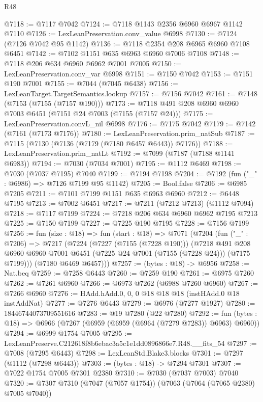 \begin{lexlean}{R48}
\begin{coremodule}
@7118 := @7117 @7042
@7124 := @7118 @1143 @2356 @6960 @6967 @1142 @7110
@7126 := LexLeanPreservation.conv_value @6998
@7130 := @7124 (@7126 @7042 @95 @1142)
@7136 := @7118 @2354 @208 @6965 @6960 @7108 @6451
@7142 := @7102 @1151 @635 @6963 @6960 @7006 @7108
@7148 := @7118 @206 @634 @6960 @6962 @7001 @7005
@7150 := LexLeanPreservation.conv_var @6998
@7151 := @7150 @7042
@7153 := @7151 @190 @7001
@7155 := @7044 (@7045 @6438)
@7156 := LexLeanTarget.TargetSemantics.lookup
@7157 := @7156 @7042
@7161 := @7148 (@7153 (@7155 (@7157 @190)))
@7173 := @7118 @491 @208 @6960 @6960 @7003 @6451 (@7151 @24 @7003 (@7155 (@7157 @24)))
@7175 := LexLeanPreservation.convL_nil @6998
@7176 := @7175 @7042
@7179 := @7142 (@7161 (@7173 @7176))
@7180 := LexLeanPreservation.prim_natSub
@7187 := @7115 (@7130 (@7136 (@7179 (@7180 @6457 @6443)) @7176))
@7188 := LexLeanPreservation.prim_natLt
@7192 := @7099 (@7187 (@7188 @1141 @6983))
@7194 := @7030 (@7034 @7001)
@7195 := @1112 @6469
@7198 := @7030 (@7037 @7195) @7040
@7199 := @7194 @7198
@7204 := @7192 (fun ("_" : @6986) => @7126 @7199 @95 @1142)
@7205 := Bool.false
@7206 := @6985 @7205
@7211 := @7101 @7199 @1151 @635 @6963 @6960
@7212 := @6448 @7195
@7213 := @7002 @6451
@7217 := @7211 (@7212 @7213) (@1112 @7094)
@7218 := @7117 @7199
@7224 := @7218 @206 @634 @6960 @6962 @7195 @7213
@7225 := @7150 @7199
@7227 := @7225 @190 @7195
@7228 := @7156 @7199
@7256 := fun (size : @18) =>
  fun (start : @18) =>
  @7071
    (@7204
      (fun ("_" : @7206) =>
      @7217
        (@7224
          (@7227 (@7155 (@7228 @190)))
          (@7218
            @491
            @208
            @6960
            @6960
            @7001
            @6451
            (@7225 @24 @7001 (@7155 (@7228 @24)))
            (@7175 @7199)))
        (@7180 @6469 @6457)))
@7257 := (bytes : @18) -> @6956
@7258 := Nat.beq
@7259 := @7258 @6443
@7260 := @7259 @190
@7261 := @6975 @7260
@7262 := @7261 @6960
@7266 := @6973 @7262 (@6988 @7260 @6960)
@7267 := @7266 @6960
@7276 := HAdd.hAdd.{0, 0, 0} @18 @18 @18 (instHAdd.{0} @18 instAddNat)
@7277 := @7276 @6443
@7279 := @6976 (@7277 @1927)
@7280 := 18446744073709551616
@7283 := @19 @7280 (@22 @7280)
@7292 := fun (bytes : @18) => @6966 (@7267 (@6959 (@6959 (@6964 (@7279 @7283)) @6963) @6960))
@7294 := @6999 @1754 @7005
@7295 := LexLeanPreserve.C212618f8b6ebac3a5c1e1dd0896866e7.R48.__fits_54
@7297 := @7008 (@7295 @6443)
@7298 := LexLeanStd.Blake3.blocks
@7301 := @7297 (@1112 (@7298 @6443))
@7303 := (bytes : @18) -> @7294 @7301
@7307 := @7022 @1754 @7005 @7301 @2380
@7310 := @7030 (@7037 @7003) @7040
@7320 := @7307 @7310 (@7047 (@7057 @1754)) (@7063 (@7064 (@7065 @2380) @7005 @7040))

\end{coremodule}
\end{lexlean}
